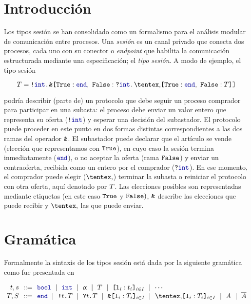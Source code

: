 \section{Introducción}

Los tipos sesión se han consolidado como un formalismo para el
análisis modular de comunicación entre procesos. Una \emph{sesión} es un canal
privado que conecta dos procesos, cada uno con su conector o \emph{endpoint}
que habilita la comunicación estructurada mediante una especificación; el
\emph{tipo sesión}. A modo de ejemplo, el tipo sesión

\begin{equation}
    \label{eq:bare.auction}
    \T = \Out\tint{
        \BinaryPBranch[]\End{
            \In\tint{
                \BinaryPChoice[]\End\T
            }
        }
    }
\end{equation}

\noindent podría describir (parte de) un protocolo que debe seguir un proceso
comprador para participar en una subasta: el proceso debe enviar un valor entero
que representa su oferta ($ \Out [] \tint $) y esperar una decisión del
subastador. El protocolo puede proceder en este punto en dos formas distintas
correspondientes a las dos ramas del operador $\Branch$. El subastador puede
declarar que el artículo se vende (elección que representamos con $\Tag[True]$),
en cuyo caso la sesión termina inmediatamente ($ \End $), o no aceptar la oferta
(rama $\Tag[False]$) y enviar un contraoferta, recibida como un entero por el
comprador ($ \In [] \tint $). En ese momento, el comprador puede elegir
($\Choice$) terminar la subasta o reiniciar el protocolo con otra oferta, aquí
denotado por $\T$. Las elecciones posibles son representadas mediante etiquetas
(en este caso $\Tag[True]$ y $\Tag[False])$, $\Branch$ describe las elecciones
que puede recibir y $\Choice$ las que puede enviar.

\section{Gramática}
\label{sec:tipos_sesion_gram}

Formalmente la sintaxis de los tipos sesión está dada por la siguiente
gramática como fue presentada en~\cite{Melgratti2017AnOI}

\[
\begin{array}{@{}r@{~~}c@{~~}l@{}}
\TypeT, \TypeS & ::= &
\tbool
\rulemid \tint
\rulemid \tvar
\rulemid \SessionType
\rulemid \set[i\in I]{ \Tag_i : \Type_i }
\rulemid \cdots
\\
\SessionTypeT, \SessionTypeS & ::= &
\End
\rulemid \Out\Type\SessionType
\rulemid \In\Type\SessionType
\rulemid \Branch \set[i\in I]{\Tag_i : \SessionType_i}
\rulemid \Choice \set[i\in I]{\Tag_i : \SessionType_i}
\rulemid \etvar
\rulemid \dual\etvar
\end{array}
\]

